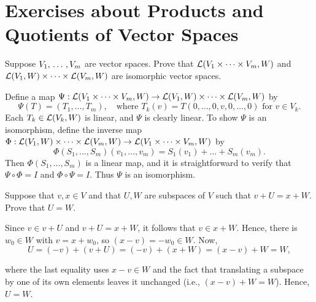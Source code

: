 \section*{Exercises about Products and Quotients of Vector Spaces}

\begin{xrcs}
  Suppose $V_1, {\, \ldots \,\,}, V_m$ are vector spaces. Prove that $\mathcal{L}(V_1 \times \dots \times V_m, W)$ and $\mathcal{L}(V_1, W) \times \dots \times \mathcal{L}(V_m, W)$ are isomorphic vector spaces.

\begin{xprf}
  Define a map $\Psi: \mathcal{L}(V_1 \times \dots \times V_m, W) \to \mathcal{L}(V_1, W) \times \dots \times \mathcal{L}(V_m, W)$ by
  \[
    \Psi(T) = (T_1, \dots, T_m), \quad \text{where } T_k(v) = T(0, \dots, 0, v, 0, \dots, 0) \text{ for } v \in V_k.
  \]
  Each $T_k \in \mathcal{L}(V_k, W)$ is linear, and $\Psi$ is clearly linear.
  To show $\Psi$ is an isomorphism, define the inverse map $\Phi: \mathcal{L}(V_1, W) \times \dots \times \mathcal{L}(V_m, W) \to \mathcal{L}(V_1 \times \dots \times V_m, W)$ by
  \[
    \Phi(S_1, \dots, S_m)(v_1, \dots, v_m) = S_1(v_1) + \dots + S_m(v_m).
  \]
  Then $\Phi(S_1, \dots, S_m)$ is a linear map, and it is straightforward to verify that $\Psi \circ \Phi = I$ and $\Phi \circ \Psi = I$.
  Thus $\Psi$ is an isomorphism.
\end{xprf}
\end{xrcs}

\begin{xrcs}
  Suppose that $v, x \in V$ and that $U, W$ are subspaces of $V$ such that $v + U = x + W$. Prove that $U = W$.
  \begin{xprf}
    Since $v \in v + U$ and $v+U = x + W$, it follows that $v \in x + W$. Hence, there is  $w_0 \in W$ with $v = x + w_0$, so $(x-v) = -w_0 \in W$. Now,
    \begin{equation}
      U = (-v) + (v+U) = (-v) + (x + W) = (x-v) + W = W,
    \end{equation}

    where the last equality uses $x-v \in W$ and the fact that translating a subspace by one of its own elements leaves it unchanged (i.e., $(x-v) + W = W$). Hence, $U = W$.
  \end{xprf}
\end{xrcs}

